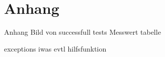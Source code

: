 \section{Anhang}
\begin{frame}{Anhang}
    Bild von successfull tests
    Messwert tabelle

    exceptions iwas
    evtl hilfsfunktion
\end{frame}
